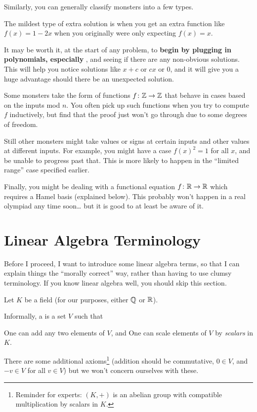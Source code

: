 \documentclass[11pt]{scrartcl}
\begin{document}
Similarly, you can generally classify monsters into a few types.
\begin{itemize}
  \ii The mildest type of extra solution is when you get an extra function like
  $f(x) = 1-2x$ when you originally were only expecting $f(x) = x$.

  It may be worth it, at the start of any problem, to
  \textbf{begin by plugging in polynomials,
    especially },
  and seeing if there are any non-obvious solutions.
  This will help you notice solutions like $x+c$ or $cx$ or $0$,
  and it will give you a huge advantage should there be an unexpected solution.

  \ii Some monsters take the form of functions $f \colon \mathbb Z \to \mathbb Z$ that behave
  in cases based on the inputs mod $n$.
  You often pick up such functions when you try to compute $f$ inductively,
  but find that the proof just won't go through
  due to some degrees of freedom.

  \ii Still other monsters might take values or signs at certain inputs
  and other values at different inputs.
  For example, you might have a case $f(x)^2 = 1$ for all $x$,
  and be unable to progress past that.
  This is more likely to happen in the ``limited range'' case specified earlier.

  \ii Finally, you might be dealing with a functional equation $f \colon \mathbb R \to \mathbb R$
  which requires a Hamel basis (explained below).
  This probably won't happen in a real olympiad any time soon\dots
  but it is good to at least be aware of it.
\end{itemize}

\section{Linear Algebra Terminology}
Before I proceed, I want to introduce some linear algebra terms,
so that I can explain things the ``morally correct'' way,
rather than having to use clumsy terminology.
If you know linear algebra well, you should skip this section.

Let $K$ be a field (for our purposes, either $\mathbb Q$ or $\mathbb R$).
\begin{definition}
  Informally, a  is a set $V$ such that
  \begin{itemize}
    \ii One can add any two elements of $V$, and
    \ii One can scale elements of $V$ by \emph{scalars} in $K$.
  \end{itemize}
  There are some additional axioms\footnote{Reminder for experts:
    $(K,+)$ is an abelian group with compatible multiplication by scalars in $K$.}
  (addition should be commutative, $0 \in V$, and $-v \in V$ for all $v \in V$)
  but we won't concern ourselves with these.
\end{definition}
\end{document}
